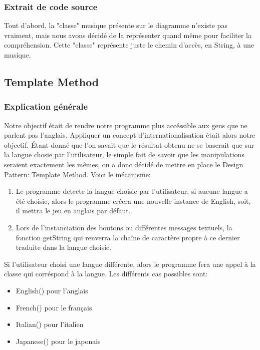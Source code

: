 \subsubsection{Extrait de code source}
Tout d'abord, la "classe" musique présente sur le diagramme n'existe pas vraiment, mais nous avons décidé de la représenter quand même pour faciliter la compréhension. Cette "classe" représente juste le chemin d'accès, en String, à une musique.


\newpage
\subsection{Template Method}

\subsubsection{Explication générale}

Notre objectif était de rendre notre programme plus accéssible aux gens que ne parlent pas l'anglais. Appliquer un concept d'internationalisation était alors notre objectif. Étant donné que l'on savait que le résultat obtenu ne se baserait que sur la langue chosie par l'utilisateur, le simple fait de savoir que les manipulations seraient exactement les mêmes, on a donc décidé de mettre en place le Design Pattern: Template Method. Voici le mécanisme:
\begin{enumerate}
\item Le programme detecte la langue choisie par l'utilisateur, si aucune langue a été choisie, alors le programme créera une nouvelle instance de English, soit, il mettra le jeu en anglais par défaut.
\item Lors de l'instanciation des boutons ou différentes messages textuels, la fonction getString qui renverra la chaîne de caractère propre à ce dernier traduite dans la langue choisie.
\end{enumerate}

Si l'utilisateur choisi une langue différente, alors le programme fera une appel à la classe qui corréspond à la langue.
Les différents cas possibles sont:
\begin{itemize}
\item English() pour l'anglais
\item French() pour le français
\item Italian() pour l'italien
\item Japanese() pour le japonais
\end{itemize}

